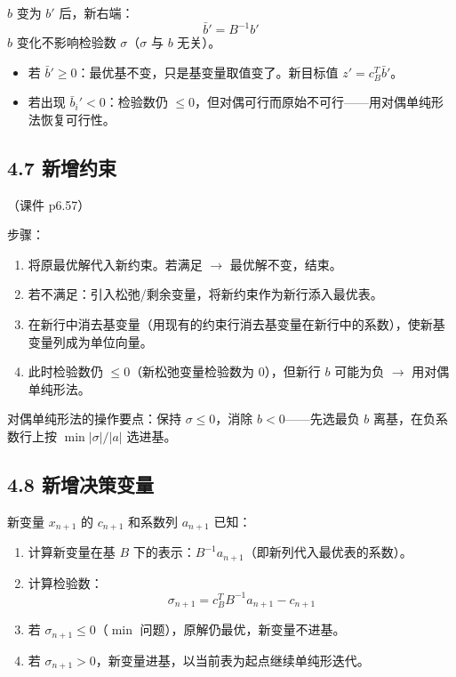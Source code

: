 $b$ 变为 $b'$ 后，新右端：
\[
\bar{b}' = B^{-1} b'
\]
$b$ 变化不影响检验数 $\sigma$（$\sigma$ 与 $b$ 无关）。

\begin{itemize}
  \item 若 $\bar{b}' \ge 0$：最优基不变，只是基变量取值变了。新目标值 $z' = c_B^T \bar{b}'$。
  \item 若出现 $\bar{b}_i' < 0$：检验数仍 $\le 0$，但对偶可行而原始不可行——用对偶单纯形法恢复可行性。
\end{itemize}

\subsection{4.7 新增约束}

（课件 p6.57）

步骤：
\begin{enumerate}
  \item 将原最优解代入新约束。若满足 $\to$ 最优解不变，结束。
  \item 若不满足：引入松弛/剩余变量，将新约束作为新行添入最优表。
  \item 在新行中消去基变量（用现有的约束行消去基变量在新行中的系数），使新基变量列成为单位向量。
  \item 此时检验数仍 $\le 0$（新松弛变量检验数为 0），但新行 $b$ 可能为负 $\to$ 用对偶单纯形法。
\end{enumerate}

对偶单纯形法的操作要点：保持 $\sigma \le 0$，消除 $b < 0$——先选最负 $b$ 离基，在负系数行上按 $\min |\sigma|/|a|$ 选进基。

\subsection{4.8 新增决策变量}

新变量 $x_{n+1}$ 的 $c_{n+1}$ 和系数列 $a_{n+1}$ 已知：

\begin{enumerate}
  \item 计算新变量在基 $B$ 下的表示：$B^{-1}a_{n+1}$（即新列代入最优表的系数）。
  \item 计算检验数：
        \[
        \sigma_{n+1} = c_B^T B^{-1} a_{n+1} - c_{n+1}
        \]
  \item 若 $\sigma_{n+1} \le 0$（$\min$ 问题），原解仍最优，新变量不进基。
  \item 若 $\sigma_{n+1} > 0$，新变量进基，以当前表为起点继续单纯形迭代。
\end{enumerate}

